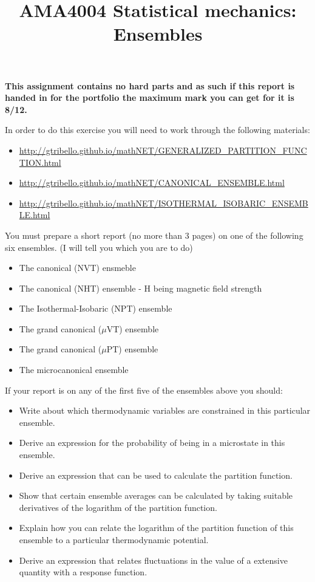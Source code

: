 \documentclass[a4paper]{article}
\title{
\vspace{-3em}
\begin{tcolorbox}
\Huge\sffamily AMA4004 Statistical mechanics: Ensembles  
\end{tcolorbox}
\vspace{-3em}
}
\date{}
\begin{document}
\maketitle

{\bf This assignment contains no hard parts and as such if this report is handed in for the portfolio the maximum mark you can get for it is 8/12.}

In order to do this exercise you will need to work through the following materials:

\begin{itemize}
\item \href{http://gtribello.github.io/mathNET/GENERALIZED\_PARTITION\_FUNCTION.html}{http://gtribello.github.io/mathNET/GENERALIZED\_PARTITION\_FUNCTION.html}
\item \href{http://gtribello.github.io/mathNET/CANONICAL\_ENSEMBLE.html}{http://gtribello.github.io/mathNET/CANONICAL\_ENSEMBLE.html}
\item \href{http://gtribello.github.io/mathNET/ISOTHERMAL\_ISOBARIC\_ENSEMBLE.html}{http://gtribello.github.io/mathNET/ISOTHERMAL\_ISOBARIC\_ENSEMBLE.html}
\end{itemize}

You must prepare a short report (no more than 3 pages) on one of the following six ensembles.  (I will tell you which you are to do)

\begin{itemize}
\item The canonical (NVT) ensmeble
\item The canonical (NHT) ensemble - H being magnetic field strength
\item The Isothermal-Isobaric (NPT) ensemble 
\item The grand canonical ($\mu$VT) ensemble
\item The grand canonical ($\mu$PT) ensemble
\item The microcanonical ensemble
\end{itemize}

If your report is on any of the first five of the ensembles above you should:

\begin{itemize}
\item Write about which thermodynamic variables are constrained in this particular ensemble.
\item Derive an expression for the probability of being in a microstate in this ensemble.
\item Derive an expression that can be used to calculate the partition function.
\item Show that certain ensemble averages can be calculated by taking suitable derivatives of the logarithm of the partition function.
\item Explain how you can relate the logarithm of the partition function of this ensemble to a particular thermodynamic potential.
\item Derive an expression that relates fluctuations in the value of a extensive quantity with a response function. 
\end{itemize}
\end{document}
